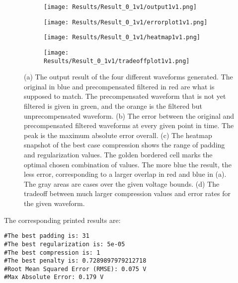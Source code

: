 \documentclass[11pt, a4paper]{article}
\theoremstyle{definition}
\numberwithin{equation}{section}
\begin{document}
\begin{figure}[hbt!]
\centering
\begin{subfigure}{.45\linewidth}
  \centering
  \texttt{[image: Results/Result\_0\_1v1/output1v1.png]}
  \subcaption{}
  \label{output1v1}
\end{subfigure}
\quad
\begin{subfigure}{.45\linewidth}
  \centering
  \texttt{[image: Results/Result\_0\_1v1/errorplot1v1.png]}
  \subcaption{}
  \label{errorplot1v1}
\end{subfigure}
\begin{subfigure}{.45\linewidth}
  \centering
  \texttt{[image: Results/Result\_0\_1v1/heatmap1v1.png]}
  \subcaption{}
  \label{heatmap1v1}
\end{subfigure}
\quad
\begin{subfigure}{.45\linewidth}
  \centering
  \texttt{[image: Results/Result\_0\_1v1/tradeoffplot1v1.png]}
  \caption{}
  \label{tradeoffplot1v1}
\end{subfigure}
\caption{(a) The output result of the four different waveforms generated. The original in blue and precompensated filtered in red are what is supposed to match. The precompensated waveform that is not yet filtered is given in green, and the orange is the filtered but unprecompensated waveform. (b) The error between the original and precompensated filtered waveforms at every given point in time. The peak is the maximum absolute error overall. (c) The heatmap snapshot of the best case compression shows the range of padding and regularization values. The golden bordered cell marks the optimal chosen combination of values. The more blue the result, the less error, corresponding to a larger overlap in red and blue in (a). The gray areas are cases over the given voltage bounds. (d) The tradeoff between much larger compression values and error rates for the given waveform.}
\label{fig:1v1}
\end{figure}

The corresponding printed results are:

\begin{verbatim}
#The best padding is: 31
#The best regularization is: 5e-05
#The best compression is: 1
#The best penalty is: 0.7289897979212718
#Root Mean Squared Error (RMSE): 0.075 V
#Max Absolute Error: 0.179 V
\end{verbatim}
\end{document}
